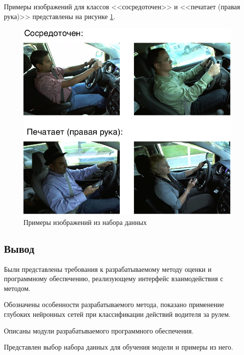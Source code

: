 Примеры изображений для классов <<сосредоточен>> и  <<печатает (правая рука)>> представлены на рисунке \ref{fig:classes_example}.

\begin{figure}[H]
	\centering
	\includegraphics[scale=0.9]{img/classes_example.pdf}
	\caption{Примеры изображений из набора данных}
	\label{fig:classes_example}
\end{figure}

\subsection*{Вывод}

Были представлены требования к разрабатываемому методу оценки и программному обеспечению, реализующему интерфейс взаимодействия с методом.

Обозначены особенности разрабатываемого метода,
показано применение глубоких нейронных сетей при классификации действий водителя за рулем.

Описаны модули разрабатываемого программного обеспечения.

Представлен выбор набора данных для обучения модели и примеры из него.

\pagebreak